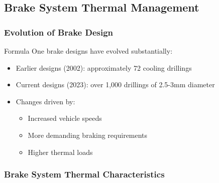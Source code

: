 \subsection*{Brake System Thermal Management}

\subsubsection*{Evolution of Brake Design}

Formula One brake designs have evolved substantially:
\begin{itemize}
    \item Earlier designs (2002): approximately 72 cooling drillings
    \item Current designs (2023): over 1,000 drillings of 2.5-3mm diameter
    \item Changes driven by:
    \begin{itemize}
        \item Increased vehicle speeds
        \item More demanding braking requirements
        \item Higher thermal loads
    \end{itemize}
\end{itemize}

\subsubsection*{Brake System Thermal Characteristics}

